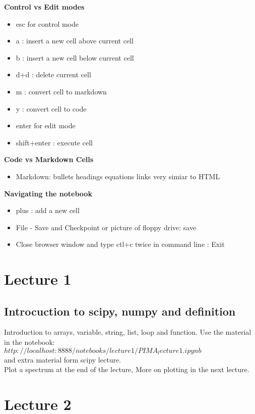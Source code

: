 \documentclass[11pt]{book}
\begin{document}
{\bf Control vs Edit modes}
\begin{itemize}
\item esc for control mode
\item a : insert a new cell above current cell
\item b : insert a new cell below current cell
\item d+d : delete current cell
\item m : convert cell to markdown
\item y : convert cell to code
\item enter for edit mode
\item shift+enter : execute cell
\end{itemize}

{ \bf Code vs Markdown Cells}
\begin{itemize}
\item Markdown:
\subitem bullets
\subitem headings
\subitem equations
\subitem links
\subitem very simiar to HTML
\end{itemize}
{\bf Navigating the notebook}
\begin{itemize}
\item plus : add a new cell
\item File - Save and Checkpoint or picture of floppy drive: save
\item Close browser window and type ctl+c twice in command line : Exit
\end{itemize}

\chapter{Lecture 1}
\section{Introcuction to scipy, numpy and definition}
Introduction to arrays, variable, string, list, loop and function.
Use the material in the notebook: \\
$http://localhost:8888/notebooks/lecture1/PIMA_lecture1.ipynb$ \\

and extra material form scipy lecture.\\
Plot a spectrum at the end of the lecture, More on plotting in the next lecture.

\chapter{Lecture 2}
\end{document}
